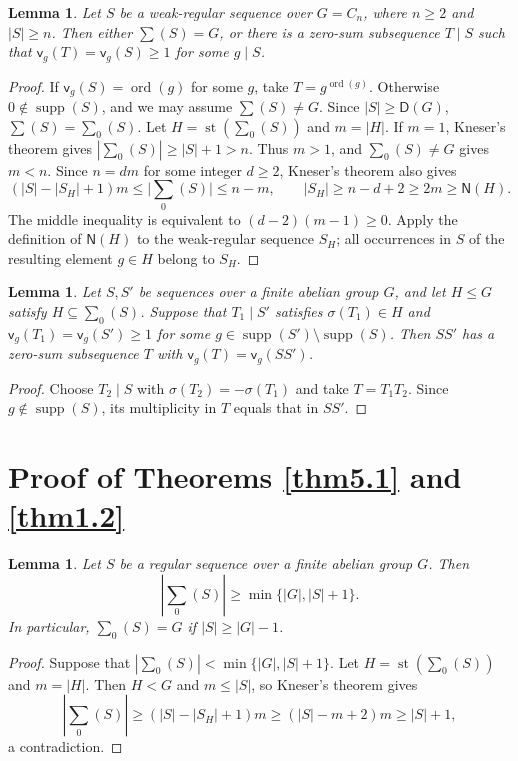 \documentclass[10pt,a4paper]{amsart}
\newtheorem{lem}[thm]{Lemma}
\theoremstyle{definition}
\theoremstyle{remark}
\numberwithin{equation}{section}
\DeclareMathOperator{\ord}{ord}
\DeclareMathOperator{\supp}{supp}
\DeclareMathOperator{\st}{st}
\begin{document}
\begin{lem}\label{lem2.8}
Let $S$ be a weak-regular sequence over $G=C_n$, where $n\ge2$ and $|S|\ge n$.
Then either $\sum(S)=G$, or there is a zero-sum subsequence $T\mid S$
such that $\mathsf{v}_g(T)=\mathsf{v}_g(S)\ge1$ for some $g\mid S$.
\end{lem}
\begin{proof}
If $\mathsf{v}_g(S)=\ord(g)$ for some $g$, take $T=g^{\ord(g)}$.
Otherwise $0\notin\supp(S)$, and we may assume $\sum(S)\ne G$.
Since $|S|\ge \mathsf D(G)$, $\sum(S)=\sum_0(S)$.
Let $H=\st(\sum_0(S))$ and $m=|H|$.
If $m=1$, Kneser's theorem gives $|\sum_0(S)|\ge|S|+1>n$.
Thus $m>1$, and $\sum_0(S)\ne G$ gives $m<n$.
Since $n=dm$ for some integer $d\ge2$, Kneser's theorem also gives
\[
(|S|-|S_H|+1)m\le\bigl|\sum_0(S)\bigr|\le n-m,
\qquad
|S_H|\ge n-d+2\ge2m\ge\mathsf{N}(H).
\]
The middle inequality is equivalent to $(d-2)(m-1)\ge0$.
Apply the definition of $\mathsf{N}(H)$ to the weak-regular sequence $S_H$;
all occurrences in $S$ of the resulting element $g\in H$ belong to $S_H$.
\end{proof}

\begin{lem}\label{lem2.9}
Let $S,S'$ be sequences over a finite abelian group $G$, and let
$H\le G$ satisfy $H\subseteq\sum_0(S)$.
Suppose that $T_1\mid S'$ satisfies $\sigma(T_1)\in H$ and
$\mathsf{v}_g(T_1)=\mathsf{v}_g(S')\ge1$ for some
$g\in\supp(S')\setminus\supp(S)$.
Then $SS'$ has a zero-sum subsequence $T$ with
$\mathsf{v}_g(T)=\mathsf{v}_g(SS')$.
\end{lem}
\begin{proof}
Choose $T_2\mid S$ with $\sigma(T_2)=-\sigma(T_1)$ and take $T=T_1T_2$.
Since $g\notin\supp(S)$, its multiplicity in $T$ equals that in $SS'$.
\end{proof}

\section{Proof of Theorems \ref{thm5.1} and \ref{thm1.2}}

\begin{lem}\label{lem:c0-regular-sums}
Let $S$ be a regular sequence over a finite abelian group $G$. Then
\[
|\sum_0(S)|\ge \min\{|G|,|S|+1\}.
\]
In particular, $\sum_0(S)=G$ if $|S|\ge |G|-1$.
\end{lem}

\begin{proof}
Suppose that $|\sum_0(S)|<\min\{|G|,|S|+1\}$.
Let $H=\st(\sum_0(S))$ and $m=|H|$.
Then $H<G$ and $m\le |S|$, so Kneser's theorem gives
\[
|\sum_0(S)|\ge (|S|-|S_H|+1)m
\ge (|S|-m+2)m\ge |S|+1,
\]
a contradiction.
\end{proof}
\end{document}
